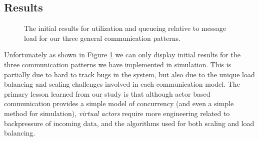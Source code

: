 \documentclass[conference,twocolumn,10pt]{IEEEtran}
\begin{document}
\subsection{Results}

\begin{figure}[!t]
    \centering
    \hfil
    \hfil
    \caption{The initial results for utilization and queueing relative to message load for our three general communication patterns.}
    \label{fig:communications_patterns_simulations}
\end{figure}

Unfortunately as shown in Figure \ref{fig:communications_patterns_simulations} we can only display initial results for the three communication patterns we have implemented in simulation. This is partially due to hard to track bugs in the system, but also due to the unique load balancing and scaling challenges involved in each communication model. The primary lesson learned from our study is that although actor based communication provides a simple model of concurrency (and even a simple method for simulation), \textit{virtual actors} require more engineering related to backpressure of incoming data, and the algorithms used for both scaling and load balancing.
\end{document}
